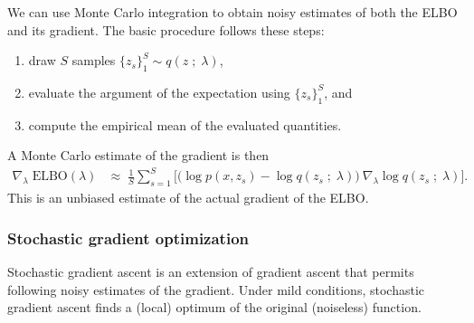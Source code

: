 We can use Monte Carlo integration to obtain noisy estimates of both the ELBO
and its gradient. The basic procedure follows these steps:
\begin{enumerate}
  \item draw $S$ samples $\{z_s\}_1^S \sim q(z\;;\;\lambda)$,
  \item evaluate the argument of the expectation using $\{z_s\}_1^S$, and
  \item compute the empirical mean of the evaluated quantities.
\end{enumerate}

A Monte Carlo estimate of the gradient is then
\begin{align*}
  \nabla_\lambda\;
  \text{ELBO}(\lambda)
  &\approx\; 
  \frac{1}{S}
  \sum_{s=1}^{S}
  \big[
  \big(
  \log p(x, z_s)
  -
  \log q(z_s\;;\;\lambda)
  \big)
  \:
  \nabla_\lambda \log q(z_s\;;\;\lambda)
  \big].
\end{align*}
This is an unbiased estimate of the actual gradient of the ELBO. 

\subsubsection{Stochastic gradient optimization}

Stochastic gradient ascent is an extension of gradient ascent that permits
following noisy estimates of the gradient. Under mild conditions, stochastic
gradient ascent finds a (local) optimum of the original (noiseless) function.
